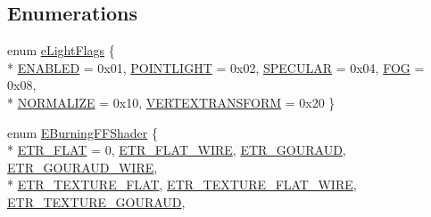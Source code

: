 \subsection*{Enumerations}
\begin{DoxyCompactItemize}
\item 
enum \hyperlink{namespaceirr_1_1video_a69ad1fdbbab524400afae5ce712b8294}{e\-Light\-Flags} \{ \\*
\hyperlink{namespaceirr_1_1video_a69ad1fdbbab524400afae5ce712b8294a283622c351f64786b88d9dbcd83e7e64}{E\-N\-A\-B\-L\-E\-D} = 0x01, 
\hyperlink{namespaceirr_1_1video_a69ad1fdbbab524400afae5ce712b8294af0ca87638b93e976479a96bde62a246d}{P\-O\-I\-N\-T\-L\-I\-G\-H\-T} = 0x02, 
\hyperlink{namespaceirr_1_1video_a69ad1fdbbab524400afae5ce712b8294abd7ffed0d30248cf24b18363f0639633}{S\-P\-E\-C\-U\-L\-A\-R} = 0x04, 
\hyperlink{namespaceirr_1_1video_a69ad1fdbbab524400afae5ce712b8294a7f38cba7ca5ce812c8a3f8906629a248}{F\-O\-G} = 0x08, 
\\*
\hyperlink{namespaceirr_1_1video_a69ad1fdbbab524400afae5ce712b8294a4f96cc15301118f8e762768cb9fd2ca0}{N\-O\-R\-M\-A\-L\-I\-Z\-E} = 0x10, 
\hyperlink{namespaceirr_1_1video_a69ad1fdbbab524400afae5ce712b8294a2bdc46e0871ecb956074618797236daf}{V\-E\-R\-T\-E\-X\-T\-R\-A\-N\-S\-F\-O\-R\-M} = 0x20
 \}
\item 
enum \hyperlink{namespaceirr_1_1video_a310498036ab89dcbbcb25db0f0b98f72}{E\-Burning\-F\-F\-Shader} \{ \\*
\hyperlink{namespaceirr_1_1video_a4511bd8f4f5da6146a7a7f18b64bcecaaa3ad27660fffaa85fc76bdc183e1af2d}{E\-T\-R\-\_\-\-F\-L\-A\-T} = 0, 
\hyperlink{namespaceirr_1_1video_a4511bd8f4f5da6146a7a7f18b64bcecaa4d12e8a1a6dd4b2d5f11f933509cc878}{E\-T\-R\-\_\-\-F\-L\-A\-T\-\_\-\-W\-I\-R\-E}, 
\hyperlink{namespaceirr_1_1video_a4511bd8f4f5da6146a7a7f18b64bcecaac49c9c9d760be0fc4fd69d697d22668e}{E\-T\-R\-\_\-\-G\-O\-U\-R\-A\-U\-D}, 
\hyperlink{namespaceirr_1_1video_a4511bd8f4f5da6146a7a7f18b64bcecaadf553babc38e8ac3e0cbbcb52ecab2eb}{E\-T\-R\-\_\-\-G\-O\-U\-R\-A\-U\-D\-\_\-\-W\-I\-R\-E}, 
\\*
\hyperlink{namespaceirr_1_1video_a4511bd8f4f5da6146a7a7f18b64bcecaa0f2b6c6400b83edd6a93f3cfb5d2bcb4}{E\-T\-R\-\_\-\-T\-E\-X\-T\-U\-R\-E\-\_\-\-F\-L\-A\-T}, 
\hyperlink{namespaceirr_1_1video_a4511bd8f4f5da6146a7a7f18b64bcecaa58ba7a004ffa5c6060141679b55b37f4}{E\-T\-R\-\_\-\-T\-E\-X\-T\-U\-R\-E\-\_\-\-F\-L\-A\-T\-\_\-\-W\-I\-R\-E}, 
\hyperlink{namespaceirr_1_1video_a4511bd8f4f5da6146a7a7f18b64bcecaa36a3217d611cb305f662633adcfc66d6}{E\-T\-R\-\_\-\-T\-E\-X\-T\-U\-R\-E\-\_\-\-G\-O\-U\-R\-A\-U\-D}, 

\end{DoxyCompactItemize}
